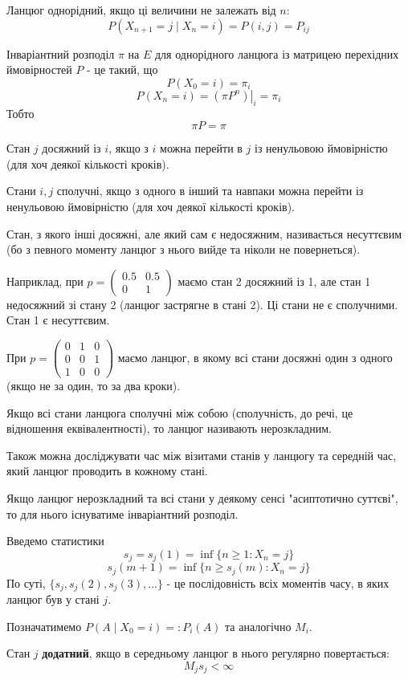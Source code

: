 \documentclass[11pt, a4paper]{article} %
\begin{document}
Ланцюг однорідний, якщо ці величини не залежать від $n$:
\[P(X_{n+1} = j \;|\; X_{n} = i) = P(i,j) = P_{ij}\]

Інваріантний розподіл $\pi$ на $E$ для однорідного ланцюга із матрицею перехідних ймовірностей $P$ - це такий, що 
\[P(X_0 = i) = \pi_i\] 
\[P(X_n = i) = \left.\left(\pi P^n\right)\right|_i = \pi_i\]
Тобто
\[\pi P = \pi\]

Стан $j$ досяжний із $i$, якщо з $i$ можна перейти в $j$ із ненульовою ймовірністю (для хоч деякої кількості кроків).

Стани $i, j$ сполучні, якщо з одного в інший та навпаки можна перейти із ненульовою ймовірністю (для хоч деякої кількості кроків).  

Стан, з якого інші досяжні, але який сам є недосяжним, називається несуттєвим (бо з певного моменту ланцюг з нього вийде та ніколи не повернеться). 

Наприклад, при $p = \begin{pmatrix}
    0.5 & 0.5 \\ 0 & 1
\end{pmatrix}$ маємо стан 2 досяжний із 1, але стан 1 недосяжний зі стану 2 
(ланцюг застрягне в стані 2). Ці стани не є сполучними. Стан 1 є несуттєвим.


При $p = \begin{pmatrix}
    0 & 1 & 0 \\ 
    0 & 0 & 1 \\
    1 & 0 & 0
\end{pmatrix}$ маємо ланцюг, в якому всі стани досяжні один з одного (якщо не за один, то за два кроки).

Якщо всі стани ланцюга сполучні між собою (сполучність, до речі, це відношення еквівалентності), то ланцюг називають нерозкладним.

Також можна досліджувати час між візитами станів у ланцюгу та середній час, який ланцюг проводить в кожному стані.

Якщо ланцюг нерозкладний та всі стани у деякому сенсі "асиптотично суттєві", то для нього існуватиме інваріантний розподіл.

Введемо статистики
\[s_{j} = s_j(1) = \inf\{n\ge 1 : X_n = j\}\]
\[s_{j}(m+1) = \inf\{n\ge s_j(m) : X_n = j\}\]
По суті, $\{s_j, s_j(2), s_j(3), ...\}$ - це послідовність всіх моментів часу, в яких ланцюг був у стані $j$.

Позначатимемо $P(A \;|\; X_0=i) =: P_i(A)$ та аналогічно $M_i$.

Стан $j$ \textbf{додатний}, якщо в середньому ланцюг в нього регулярно повертається:
\[M_js_j < \infty\]
\end{document}
